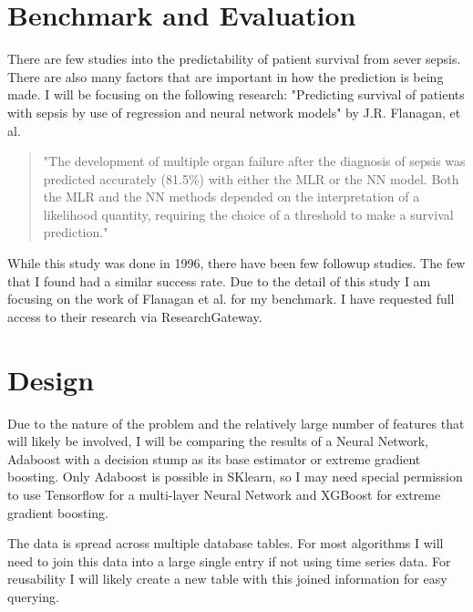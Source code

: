 \documentclass[11pt]{article}
\begin{document}
\section{Benchmark and Evaluation}
There are few studies into the predictability of patient survival from sever sepsis. There are also many factors that are important in how the prediction is being made. I will be focusing on the following research: "Predicting survival of patients with sepsis by use of regression and neural network models" by J.R. Flanagan, et al. \begin{quotation}
  "The development of multiple organ failure after the diagnosis of sepsis was predicted accurately (81.5\%) with either the MLR or the NN model. Both the MLR and the NN methods depended on the interpretation of a likelihood quantity, requiring the choice of a threshold to make a survival prediction."\cite{sepsisresearch}
\end{quotation}

While this study was done in 1996, there have been few followup studies. The few that I found had a similar success rate. Due to the detail of this study I am focusing on the work of Flanagan et al. for my benchmark. I have requested full access to their research via ResearchGateway.

\section{Design}
Due to the nature of the problem and the relatively large number of features that will likely be involved, I will be comparing the results of a Neural Network, Adaboost with a decision stump as its base estimator or extreme gradient boosting. Only Adaboost is possible in SKlearn, so I may need special permission to use Tensorflow for a multi-layer Neural Network and XGBoost for extreme gradient boosting.

The data is spread across multiple database tables. For most algorithms I will need to join this data into a large single entry if not using time series data. For reusability I will likely create a new table with this joined information for easy querying.


{}

\end{document}
